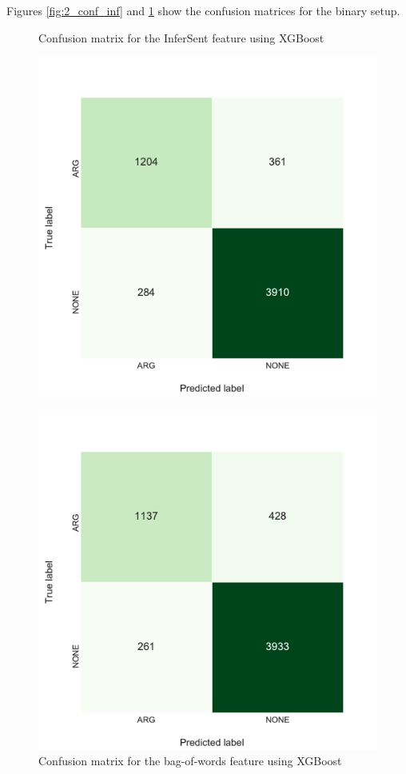 Figures \ref{fig:2_conf_inf} and \ref{fig:2_conf_uni} show the confusion matrices for the binary setup. 
\begin{figure}[h]
    \begin{minipage}{.5\linewidth}
   \caption{Confusion matrix for the InferSent feature using XGBoost} 
    \label{fig:2_conf_inf}
 \centering
	\includegraphics[width=1\textwidth]{images/experiments/conf-InferSent_True}
  \end{minipage} \hfill
    \begin{minipage}{.5\linewidth}
  
     \caption{Confusion matrix for the bag-of-words feature using XGBoost} 
       \label{fig:2_conf_uni}
 \centering
	\includegraphics[width=1\textwidth]{images/experiments/conf-Bag-Of-Words_true}
    \end{minipage} 
\end{figure}
